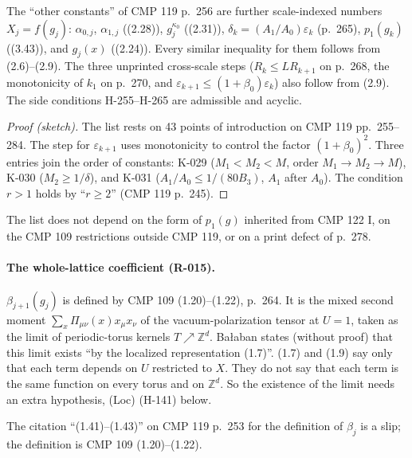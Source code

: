 \begin{proposition}\label{prop:L023}
The ``other constants'' of CMP 119 p.~256 are further scale-indexed numbers $X_j=f(g_j)$: $\alpha_{0,j}$, $\alpha_{1,j}$ ((2.28)), $g_j^{\kappa_0}$ ((2.31)), $\delta_k=(A_1/A_0)\varepsilon_k$ (p.~265), $p_1(g_k)$ ((3.43)), and $g_j(x)$ ((2.24)). Every similar inequality for them follows from (2.6)--(2.9). The three unprinted cross-scale steps ($R_k\le LR_{k+1}$ on p.~268, the monotonicity of $k_1$ on p.~270, and $\varepsilon_{k+1}\le(1+\beta_0)\varepsilon_k$) also follow from (2.9). The side conditions H-255--H-265 are admissible and acyclic.
\end{proposition}
\begin{proof}[Proof (sketch)]
The list rests on 43 points of introduction on CMP 119 pp.~255--284. The step for $\varepsilon_{k+1}$ uses monotonicity to control the factor $(1+\beta_0)^2$. Three entries join the order of constants: K-029 ($M_1<M_2<M$, order $M_1\to M_2\to M$), K-030 ($M_2\ge1/\delta$), and K-031 ($A_1/A_0\le1/(80B_3)$, $A_1$ after $A_0$). The condition $r>1$ holds by ``$r\ge2$'' (CMP 119 p.~245).
\end{proof}
The list does not depend on the form of $p_1(g)$ inherited from CMP 122 I, on the CMP 109 restrictions outside CMP 119, or on a print defect of p.~278.

\paragraph{The whole-lattice coefficient (R-015).} $\beta_{j+1}(g_j)$ is defined by CMP 109 (1.20)--(1.22), p.~264. It is the mixed second moment $\sum_x\Pi_{\mu\nu}(x)x_\mu x_\nu$ of the vacuum-polarization tensor at $U=1$, taken as the limit of periodic-torus kernels $T\nearrow\mathbb Z^d$. Ba{\l}aban states (without proof) that this limit exists ``by the localized representation (1.7)''. (1.7) and (1.9) say only that each term depends on $U$ restricted to $X$. They do not say that each term is the same function on every torus and on $\mathbb Z^d$. So the existence of the limit needs an extra hypothesis, (Loc) (H-141) below.

\begin{remark}[CMP 119 p.~253]
The citation ``(1.41)--(1.43)'' on CMP 119 p.~253 for the definition of $\beta_j$ is a slip; the definition is CMP 109 (1.20)--(1.22).
\end{remark}

